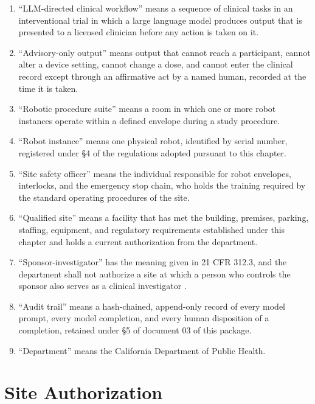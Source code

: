 \begin{enumerate}
\item ``LLM-directed clinical workflow'' means a sequence of clinical tasks in
  an interventional trial in which a large language model produces output that
  is presented to a licensed clinician before any action is taken on it.

\item ``Advisory-only output'' means output that cannot reach a participant,
  cannot alter a device setting, cannot change a dose, and cannot enter the
  clinical record except through an affirmative act by a named human, recorded
  at the time it is taken.

\item ``Robotic procedure suite'' means a room in which one or more robot
  instances operate within a defined envelope during a study procedure.

\item ``Robot instance'' means one physical robot, identified by serial number,
  registered under §4 of the regulations adopted pursuant to this chapter.

\item ``Site safety officer'' means the individual responsible for robot
  envelopes, interlocks, and the emergency stop chain, who holds the training
  required by the standard operating procedures of the site.

\item ``Qualified site'' means a facility that has met the building, premises,
  parking, staffing, equipment, and regulatory requirements established under
  this chapter and holds a current authorization from the department.

\item ``Sponsor-investigator'' has the meaning given in 21 CFR 312.3, and the
  department shall not authorize a site at which a person who controls the
  sponsor also serves as a clinical investigator \cite{cfr312,cfr54}.

\item ``Audit trail'' means a hash-chained, append-only record of every model
  prompt, every model completion, and every human disposition of a completion,
  retained under §5 of document 03 of this package.

\item ``Department'' means the California Department of Public Health.
\end{enumerate}

\section{Site Authorization}

